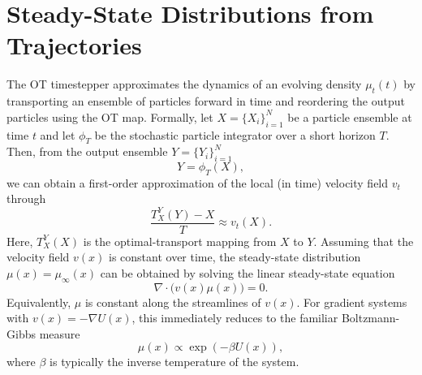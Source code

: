 \documentclass{article}
\begin{document}
\section{Steady-State Distributions from Trajectories} \label{sec:trajectories}
The OT timestepper approximates the dynamics of an evolving density $\mu_t(t)$ by transporting an ensemble of particles forward in time and reordering the output particles using the OT map. Formally, let $X=\{X_i\}_{i=1}^N$ be a particle ensemble at time $t$ and let $\phi_{T}$ be the stochastic particle integrator over a short horizon $T$. Then, from the output ensemble $Y=\{Y_i\}_{i=1}^N$
\begin{equation}
    Y = \phi_{T}(X),
\end{equation}
we can obtain a first-order approximation of the local (in time) velocity field $v_t$ through
\begin{equation} \label{eq:OT_Euler}
    \frac{T_X^Y(Y) - X}{T} \approx v_t(X).
\end{equation}
Here, $T_X^Y(X)$ is the optimal-transport mapping from $X$ to $Y$. Assuming that the velocity field $v(x)$ is constant over time, the steady-state distribution $\mu(x) = \mu_{\infty}(x)$ can be obtained by solving the linear steady-state equation
\begin{equation} \label{eq:ss_velocity_invariant}
    \nabla \cdot \big(v(x)\mu(x)\big) = 0.
\end{equation}
Equivalently, $\mu$ is constant along the streamlines of $v(x)$. For gradient systems with $v(x) = -\nabla U(x)$, this immediately reduces to the familiar Boltzmann-Gibbs measure
\begin{equation} \label{eq:boltzmann-gibbs}
    \mu(x) \propto \exp(-\beta U(x)),
\end{equation}
where $\beta$ is typically the inverse temperature of the system.
\end{document}
